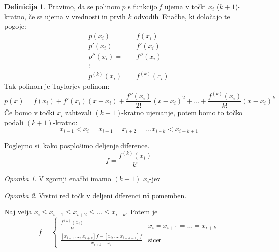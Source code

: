 \documentclass[a4paper,12pt]{article}
\theoremstyle{definition}
\newtheorem{defn}[counter]{Definicija}
\theoremstyle{remark}
\newtheorem*{rem}{Opomba}
\newcounter{subsubsubsection}[subsubsection]
\begin{document}
\begin{defn}
    Pravimo, da se polinom $p$ s funkcijo $f$ ujema v točki $x_i$ ($k+1$)-kratno, če se ujema v vrednosti in prvih $k$ odvodih.
    Enačbe, ki določajo te pogoje:
    \begin{align*}
        p(x_i) =& f(x_i) \\
        p'(x_i) =& f'(x_i) \\
        p''(x_i) =& f''(x_i) \\
        \vdots& \\
        p^{(k)}(x_i) =& f^{(k)}(x_i)
    \end{align*}
    Tak polinom je Taylorjev polinom:
    \begin{equation*}
        p(x) = f(x_i) + f'(x_i)(x-x_i) + \frac{f''(x_i)}{2!}(x-x_i)^2 + \dots + \frac{f^{(k)}(x_i)}{k!}(x-x_i)^k
    \end{equation*}
    Če bomo v točki $x_i$ zahtevali $(k+1)$-kratno ujemanje, potem bomo to točko podali $(k+1)$-kratno:
    \begin{equation*}
        x_{i-1} < x_i = x_{i+1} = x_{i+2} = \dots x_{i+k} < x_{i+k+1}
    \end{equation*}
\end{defn}

Poglejmo si, kako posplošimo deljenje diference.
\begin{equation*}
    [x_i, x_i, \dots, x_i] f = \frac{f^{(k)}(x_i)}{k!}
\end{equation*}
\begin{rem}
    V zgornji enačbi imamo $(k+1)$ $x_i$-jev
\end{rem}

\begin{rem}
    Vrstni red točk v deljeni diferenci $\textbf{ni}$ pomemben.
\end{rem}
Naj velja $x_i \leq x_{i+1} \leq x_{i+2} \leq \dots \leq x_{i+k}$. Potem je
\begin{equation*}
    [x_i, x_{i+1}, \dots, x_{i+k}] f =
    \begin{cases}
        \frac{f^{(k)}(x_i)}{k!} & x_i = x_{i+1} = \dots = x_{i+k} \\
        \frac{[x_{i+1}, \dots, x_{i+k}] f - [x_{i}, \dots, x_{i+k-1}]f}{x_{i+k} - x_{i}} & \text{sicer}
    \end{cases}
\end{equation*}
\end{document}
